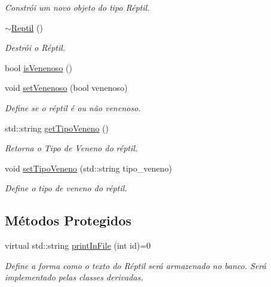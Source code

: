 \begin{DoxyCompactItemize}
\begin{DoxyCompactList}\small\item\em Constrói um novo objeto do tipo Réptil. \end{DoxyCompactList}\item 
\mbox{\label{classReptil_a826ed679cc45f74fefecef7d4d40b409}} 
\hyperlink{classReptil_a826ed679cc45f74fefecef7d4d40b409}{$\sim$\+Reptil} ()
\begin{DoxyCompactList}\small\item\em Destrói o Réptil. \end{DoxyCompactList}\item 
bool \hyperlink{classReptil_a07867a1252f279a1fd5afb576d0a5c9a}{is\+Venenoso} ()
\item 
void \hyperlink{classReptil_a9f7ab2a0e2b30040c7c9df48039a266a}{set\+Venenoso} (bool venenoso)
\begin{DoxyCompactList}\small\item\em Define se o réptil é ou não venenoso. \end{DoxyCompactList}\item 
std\+::string \hyperlink{classReptil_aa5e4cd3fa2d94916a3ba5cc20299d3cf}{get\+Tipo\+Veneno} ()
\begin{DoxyCompactList}\small\item\em Retorna o Tipo de Veneno do réptil. \end{DoxyCompactList}\item 
void \hyperlink{classReptil_a3a91e206459f45bf2f951e914b3bc195}{set\+Tipo\+Veneno} (std\+::string tipo\+\_\+veneno)
\begin{DoxyCompactList}\small\item\em Define o tipo de veneno do réptil. \end{DoxyCompactList}\end{DoxyCompactItemize}
\subsection*{Métodos Protegidos}
\begin{DoxyCompactItemize}
\item 
virtual std\+::string \hyperlink{classReptil_a53fd59f3aed9c2d463722a8e97401406}{print\+In\+File} (int id)=0
\begin{DoxyCompactList}\small\item\em Define a forma como o texto do Réptil será armazenado no banco. Será implementado pelas classes derivadas. \end{DoxyCompactList}\end{DoxyCompactItemize}
